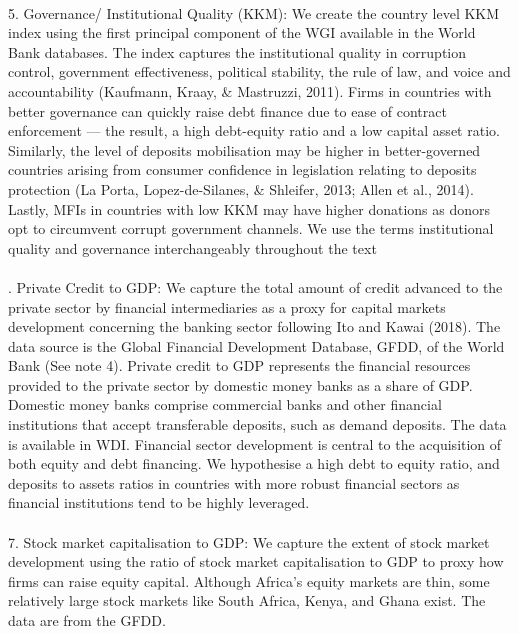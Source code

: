 \documentclass[
]{article}
\begin{document}
\begin{longtabu}
\\
5. Governance/ Institutional Quality (KKM): We create the country level KKM index using the first principal component of the WGI available in the World Bank databases. The index captures the institutional quality in corruption control, government effectiveness, political stability, the rule of law, and voice and accountability (Kaufmann, Kraay, \& Mastruzzi, 2011). Firms in countries with better governance can quickly raise debt finance due to ease of contract enforcement — the result, a high debt-equity ratio and a low capital asset ratio. Similarly, the level of deposits mobilisation may be higher in better-governed countries arising from consumer confidence in legislation relating to deposits protection (La Porta, Lopez-de-Silanes, \& Shleifer, 2013; Allen et al., 2014). Lastly, MFIs in countries with low KKM may have higher donations as donors opt to circumvent corrupt government channels. We use the terms institutional quality and governance interchangeably throughout the text\\
\\
. Private Credit to GDP: We capture the total amount of credit advanced to the private sector by financial intermediaries as a proxy for capital markets development concerning the banking sector following Ito and Kawai (2018). The data source is the Global Financial Development Database, GFDD, of the World Bank (See note 4). Private credit to GDP represents the financial resources provided to the private sector by domestic money banks as a share of GDP. Domestic money banks comprise commercial banks and other financial institutions that accept transferable deposits, such as demand deposits. The data is available in WDI. Financial sector development is central to the acquisition of both equity and debt financing. We hypothesise a high debt to equity ratio, and deposits to assets ratios in countries with more robust financial sectors as financial institutions tend to be highly leveraged.\\
\\
7. Stock market capitalisation to GDP: We capture the extent of stock market development using the ratio of stock market capitalisation to GDP to proxy how firms can raise equity capital. Although Africa's equity markets are thin, some relatively large stock markets like South Africa, Kenya, and Ghana exist. The data are from the GFDD.\\
\\

\end{longtabu}
\end{document}
